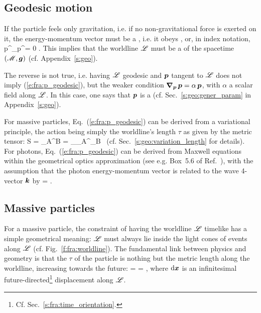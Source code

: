 \subsection{Geodesic motion} \label{s:fra:geod_motion}

If the particle feels only gravitation, i.e. if no non-gravitational force
is exerted on it, the energy-momentum vector must be a
, i.e. it obeys
\be \label{e:fra:p_geodesic}
     ,
\ee
or, in index notation,
\be
    p^\mu \nabla_\mu p^\alpha = 0 .
\ee
This implies that the worldline $\mathscr{L}$ must be a
 of the spacetime $(\mathscr{M},\bm{g})$ (cf. Appendix~\ref{s:geo}).
\begin{remark} \label{r:fra:geodesic_vector}
The reverse is not true, i.e. having $\mathscr{L}$ geodesic and $\bm{p}$
tangent to $\mathscr{L}$ does not imply (\ref{e:fra:p_geodesic}), but the
weaker condition $\bm{\nabla}_{\bm{p}}\,  \bm{p} = \alpha \, \bm{p}$, with $\alpha$
a scalar field along $\mathscr{L}$. In this case, one says that $\bm{p}$ is a
 (cf. Sec.~\ref{s:geo:gener_param}
in Appendix~\ref{s:geo}).
\end{remark}
For massive particles, Eq.~(\ref{e:fra:p_geodesic}) can be derived from
a variational principle, the action being simply the worldline's length
$\tau$ as given by the metric tensor:
\be
    S = \int_A^B \D \tau = \int_{\lambda_A}^{\lambda_B}
     \, \D\lambda
\ee
(cf. Sec.~\ref{s:geo:variation_length} for details).
For photons, Eq.~(\ref{e:fra:p_geodesic}) can be derived from
Maxwell equations
within the geometrical optics approximation (see e.g. Box~5.6 of Ref.~\cite{PoissW14}),
with the assumption that
the photon energy-momentum vector is related to the wave 4-vector $\bm{k}$ by
\be \label{e:fra:p_hbar_k}
     = \hbar {} .
\ee

\subsection{Massive particles} \label{s:fra:massive_part}

For a massive particle, the constraint of having the worldline $\mathscr{L}$ timelike
has a simple geometrical meaning: $\mathscr{L}$ must
always lie inside the light cones of events along $\mathscr{L}$ (cf. Fig.~\ref{f:fra:worldline}).
The fundamental link between physics and geometry is that the
 $\tau$ of the particle
is nothing but the metric length along the worldline, increasing towards the future:
\be \label{e:fra:proper_time}
    \D\tau =  =  ,
\ee
where $\mathrm{d}\bm{x}$ is an infinitesimal future-directed\footnote{Cf. Sec.~\ref{s:fra:time_orientation}.} displacement
along $\mathscr{L}$.

